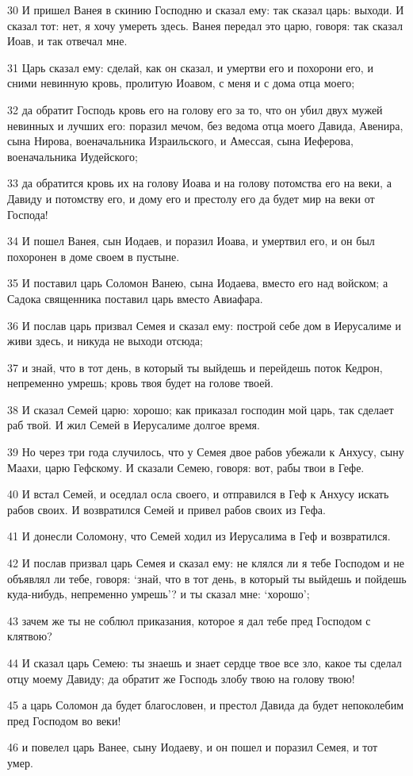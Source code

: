 \par 30 И пришел Ванея в скинию Господню и сказал ему: так сказал царь: выходи. И сказал тот: нет, я хочу умереть здесь. Ванея передал это царю, говоря: так сказал Иоав, и так отвечал мне.
\par 31 Царь сказал ему: сделай, как он сказал, и умертви его и похорони его, и сними невинную кровь, пролитую Иоавом, с меня и с дома отца моего;
\par 32 да обратит Господь кровь его на голову его за то, что он убил двух мужей невинных и лучших его: поразил мечом, без ведома отца моего Давида, Авенира, сына Нирова, военачальника Израильского, и Амессая, сына Иеферова, военачальника Иудейского;
\par 33 да обратится кровь их на голову Иоава и на голову потомства его на веки, а Давиду и потомству его, и дому его и престолу его да будет мир на веки от Господа!
\par 34 И пошел Ванея, сын Иодаев, и поразил Иоава, и умертвил его, и он был похоронен в доме своем в пустыне.
\par 35 И поставил царь Соломон Ванею, сына Иодаева, вместо его над войском; а Садока священника поставил царь вместо Авиафара.
\par 36 И послав царь призвал Семея и сказал ему: построй себе дом в Иерусалиме и живи здесь, и никуда не выходи отсюда;
\par 37 и знай, что в тот день, в который ты выйдешь и перейдешь поток Кедрон, непременно умрешь; кровь твоя будет на голове твоей.
\par 38 И сказал Семей царю: хорошо; как приказал господин мой царь, так сделает раб твой. И жил Семей в Иерусалиме долгое время.
\par 39 Но через три года случилось, что у Семея двое рабов убежали к Анхусу, сыну Маахи, царю Гефскому. И сказали Семею, говоря: вот, рабы твои в Гефе.
\par 40 И встал Семей, и оседлал осла своего, и отправился в Геф к Анхусу искать рабов своих. И возвратился Семей и привел рабов своих из Гефа.
\par 41 И донесли Соломону, что Семей ходил из Иерусалима в Геф и возвратился.
\par 42 И послав призвал царь Семея и сказал ему: не клялся ли я тебе Господом и не объявлял ли тебе, говоря: `знай, что в тот день, в который ты выйдешь и пойдешь куда-нибудь, непременно умрешь'? и ты сказал мне: `хорошо';
\par 43 зачем же ты не соблюл приказания, которое я дал тебе пред Господом с клятвою?
\par 44 И сказал царь Семею: ты знаешь и знает сердце твое все зло, какое ты сделал отцу моему Давиду; да обратит же Господь злобу твою на голову твою!
\par 45 а царь Соломон да будет благословен, и престол Давида да будет непоколебим пред Господом во веки!
\par 46 и повелел царь Ванее, сыну Иодаеву, и он пошел и поразил Семея, и тот умер.

